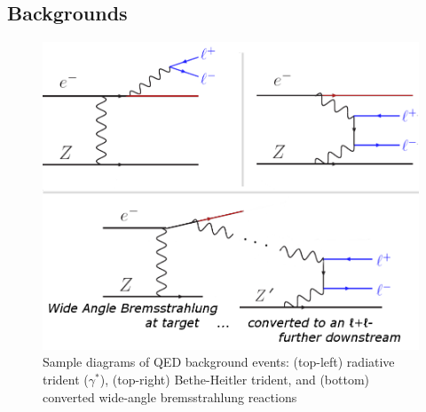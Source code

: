 \documentclass[b1]{sciposter}
\begin{document}
\begin{multicols}{3}



	\subsection*{Backgrounds}
	\begin{figure}
		\begin{center}
			\includegraphics[width=\textwidth]{trident_wab}
		\end{center}
		\caption{Sample diagrams of QED background events: (top-left) radiative trident ($\gamma^*$), (top-right) Bethe-Heitler trident, and (bottom) converted wide-angle bremsstrahlung reactions}
	\end{figure}


\end{multicols}
\end{document}
